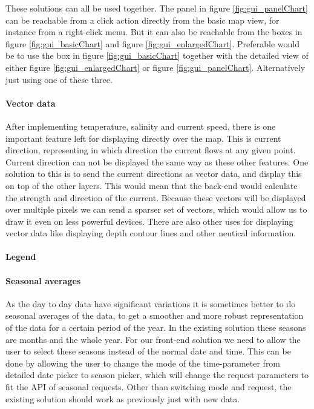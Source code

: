 \documentclass[11pt,a4paper,titlepage,oneside]{report}
\begin{document}
These solutions can all be used together. The panel in figure \ref{fig:gui_panelChart} can be reachable from a click action directly from the basic map view, for instance from a right-click menu. But it can also be reachable from the boxes in figure \ref{fig:gui_basicChart} and figure \ref{fig:gui_enlargedChart}. Preferable would be to use the box in figure \ref{fig:gui_basicChart} together with the detailed view of either figure \ref{fig:gui_enlargedChart} or figure \ref{fig:gui_panelChart}. Alternatively just using one of these three.

\paragraph{Vector data}
After implementing temperature, salinity and current speed, there is one important feature left for displaying directly over the map. This is current direction, representing in which direction the current flows at any given point. Current direction can not be displayed the same way as these other features. One solution to this is to send the current directions as vector data, and display this on top of the other layers. This would mean that the \gls{back-end} would calculate the strength and direction of the current. Because these vectors will be displayed over multiple pixels we can send a sparser set of vectors, which would allow us to draw it even on less powerful devices.
There are also other uses for displaying vector data like displaying depth contour lines and other neutical information.

\paragraph{Legend}


\paragraph{Seasonal averages} %
As the day to day data have significant variations it is sometimes better to do seasonal averages of the data, to get a smoother and more robust representation of the data for a certain period of the year. In the existing solution these seasons are months and the whole year. For our \gls{front-end} solution we need to allow the user to select these seasons instead of the normal date and time. This can be done by allowing the user to change the mode of the time-parameter from detailed date picker to season picker, which will change the request parameters to fit the API of seasonal requests. Other than switching mode and request, the existing solution should work as previously just with new data.
\end{document}
